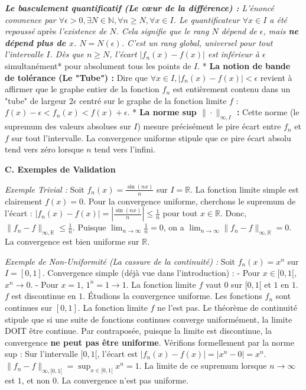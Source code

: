 \documentclass{report}
\begin{document}
\textit{   \textbf{Le basculement quantificatif (Le cœur de la différence) :} L'énoncé commence par $\forall \epsilon > 0, \exists N \in \mathbb{N}, \forall n \ge N, \forall x \in I$. Le quantificateur $\forall x \in I$ a été repoussé }après\textit{ l'existence de $N$. Cela signifie que le rang $N$ dépend de $\epsilon$, mais \textbf{ne dépend plus de $x$}. $N = N(\epsilon)$. C'est un rang global, universel pour tout l'intervalle $I$. Dès que $n \ge N$, l'écart $|f_n(x) - f(x)|$ est inférieur à $\epsilon$ }simultanément* pour absolument tous les points de $I$.
*   \textbf{La notion de bande de tolérance (Le "Tube") :} Dire que $\forall x \in I, |f_n(x) - f(x)| < \epsilon$ revient à affirmer que le graphe entier de la fonction $f_n$ est entièrement contenu dans un "tube" de largeur $2\epsilon$ centré sur le graphe de la fonction limite $f$ : $f(x) - \epsilon < f_n(x) < f(x) + \epsilon$.
*   \textbf{La norme sup $\| \cdot \|_{\infty, I}$ :} Cette norme (le supremum des valeurs absolues sur $I$) mesure précisément le pire écart entre $f_n$ et $f$ sur tout l'intervalle. La convergence uniforme stipule que ce pire écart absolu tend vers zéro lorsque $n$ tend vers l'infini.

\textbf{C. Exemples de Validation}

\textit{Exemple Trivial :}
Soit $f_n(x) = \frac{\sin(nx)}{n}$ sur $I = \mathbb{R}$. La fonction limite simple est clairement $f(x) = 0$.
Pour la convergence uniforme, cherchons le supremum de l'écart :
$|f_n(x) - f(x)| = \left| \frac{\sin(nx)}{n} \right| \le \frac{1}{n}$ pour tout $x \in \mathbb{R}$.
Donc, $\|f_n - f\|_{\infty, \mathbb{R}} \le \frac{1}{n}$.
Puisque $\lim_{n \to \infty} \frac{1}{n} = 0$, on a $\lim_{n \to \infty} \|f_n - f\|_{\infty, \mathbb{R}} = 0$. La convergence est bien uniforme sur $\mathbb{R}$.

\textit{Exemple de Non-Uniformité (La cassure de la continuité) :}
Soit $f_n(x) = x^n$ sur $I = [0, 1]$.
Convergence simple (déjà vue dans l'introduction) :
- Pour $x \in [0, 1[$, $x^n \to 0$.
- Pour $x = 1$, $1^n = 1 \to 1$.
La fonction limite $f$ vaut $0$ sur $[0, 1[$ et $1$ en $1$. $f$ est discontinue en $1$.
Étudions la convergence uniforme. Les fonctions $f_n$ sont continues sur $[0,1]$. La fonction limite $f$ ne l'est pas. Le théorème de continuité stipule que si une suite de fonctions continues converge uniformément, la limite DOIT être continue. Par contraposée, puisque la limite est discontinue, la convergence \textbf{ne peut pas être uniforme}.
Vérifions formellement par la norme sup :
Sur l'intervalle $[0, 1[$, l'écart est $|f_n(x) - f(x)| = |x^n - 0| = x^n$.
$\|f_n - f\|_{\infty, [0, 1[} = \sup_{x \in [0, 1[} x^n = 1$.
La limite de ce supremum lorsque $n \to \infty$ est $1$, et non $0$. La convergence n'est pas uniforme.
\end{document}
